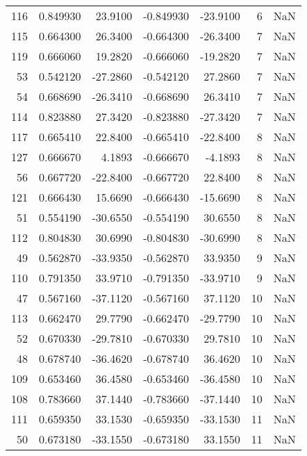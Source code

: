 \begin{tabular}{rrrrrrr}
116 &   0.849930 &   23.9100 &  -0.849930 &    -23.9100 &           6 & NaN \\
115 &   0.664300 &   26.3400 &  -0.664300 &    -26.3400 &           7 & NaN \\
119 &   0.666060 &   19.2820 &  -0.666060 &    -19.2820 &           7 & NaN \\
 53 &   0.542120 &  -27.2860 &  -0.542120 &     27.2860 &           7 & NaN \\
 54 &   0.668690 &  -26.3410 &  -0.668690 &     26.3410 &           7 & NaN \\
114 &   0.823880 &   27.3420 &  -0.823880 &    -27.3420 &           7 & NaN \\
117 &   0.665410 &   22.8400 &  -0.665410 &    -22.8400 &           8 & NaN \\
127 &   0.666670 &    4.1893 &  -0.666670 &     -4.1893 &           8 & NaN \\
 56 &   0.667720 &  -22.8400 &  -0.667720 &     22.8400 &           8 & NaN \\
121 &   0.666430 &   15.6690 &  -0.666430 &    -15.6690 &           8 & NaN \\
 51 &   0.554190 &  -30.6550 &  -0.554190 &     30.6550 &           8 & NaN \\
112 &   0.804830 &   30.6990 &  -0.804830 &    -30.6990 &           8 & NaN \\
 49 &   0.562870 &  -33.9350 &  -0.562870 &     33.9350 &           9 & NaN \\
110 &   0.791350 &   33.9710 &  -0.791350 &    -33.9710 &           9 & NaN \\
 47 &   0.567160 &  -37.1120 &  -0.567160 &     37.1120 &          10 & NaN \\
113 &   0.662470 &   29.7790 &  -0.662470 &    -29.7790 &          10 & NaN \\
 52 &   0.670330 &  -29.7810 &  -0.670330 &     29.7810 &          10 & NaN \\
 48 &   0.678740 &  -36.4620 &  -0.678740 &     36.4620 &          10 & NaN \\
109 &   0.653460 &   36.4580 &  -0.653460 &    -36.4580 &          10 & NaN \\
108 &   0.783660 &   37.1440 &  -0.783660 &    -37.1440 &          10 & NaN \\
111 &   0.659350 &   33.1530 &  -0.659350 &    -33.1530 &          11 & NaN \\
 50 &   0.673180 &  -33.1550 &  -0.673180 &     33.1550 &          11 & NaN \\

\end{tabular}
